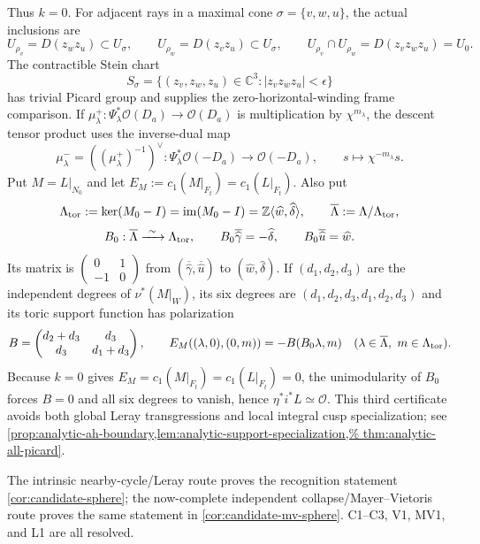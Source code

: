 \begin{auditrecord}
Thus $k=0$.  For adjacent rays in a maximal cone
$\sigma=\{v,w,u\}$, the actual inclusions are
\[
 U_{\rho_v}=D(z_wz_u)\subset U_\sigma,\qquad
 U_{\rho_w}=D(z_vz_u)\subset U_\sigma,\qquad
 U_{\rho_v}\cap U_{\rho_w}=D(z_vz_wz_u)=U_0.
\]
The contractible Stein chart
\[
 S_\sigma=\{(z_v,z_w,z_u)\in\mathbb C^3:
 |z_vz_wz_u|<\epsilon\}
\]
has trivial Picard group and supplies the zero-horizontal-winding frame
comparison.  If
$\mu_\lambda^+:\Psi_\lambda^*\mathcal O(D_a)\to\mathcal O(D_a)$
is multiplication by $\chi^{m_\lambda}$, the descent tensor product uses
the inverse-dual map
\[
 \mu_\lambda^-=((\mu_\lambda^+)^{-1})^\vee:
 \Psi_\lambda^*\mathcal O(-D_a)\longrightarrow\mathcal O(-D_a),
 \qquad s\longmapsto\chi^{-m_\lambda}s.
\]
Put $M=L|_{N_0}$ and let
$E_M:=c_1(M|_{F_t})=c_1(L|_{F_t})$.  Also put
\[
 \Lambda_{\rm tor}:=\ker(M_0-I)=\operatorname{im}(M_0-I)
 =\mathbb Z\langle\widehat w,\widehat\delta\rangle,
 \qquad \overline\Lambda:=\Lambda/\Lambda_{\rm tor},
\]
\[
 B_0:\overline\Lambda\xrightarrow{\ \sim\ }\Lambda_{\rm tor},
 \qquad
 B_0\overline{\widehat\gamma}=-\widehat\delta,\qquad
 B_0\overline{\widehat u}=\widehat w.
\]
Its matrix is
$\left(\begin{smallmatrix}0&1\\-1&0\end{smallmatrix}\right)$ from
$(\overline{\widehat\gamma},\overline{\widehat u})$ to
$(\widehat w,\widehat\delta)$.
If $(d_1,d_2,d_3)$ are the independent degrees of
$\nu^*(M|_W)$, its six degrees are
$(d_1,d_2,d_3,d_1,d_2,d_3)$ and its toric support function has
polarization
\[
 B=\begin{pmatrix}d_2+d_3&d_3\\d_3&d_1+d_3\end{pmatrix},
 \qquad E_M((\lambda,0),(0,m))=-B(B_0\lambda,m)
 \quad(\lambda\in\overline\Lambda,\ m\in\Lambda_{\rm tor}).
\]
Because $k=0$ gives
$E_M=c_1(M|_{F_t})=c_1(L|_{F_t})=0$, the unimodularity of $B_0$ forces
$B=0$ and all six degrees to vanish, hence
$\eta^*i^*L\simeq\mathcal O$.  This third certificate avoids both global
Leray transgressions and local integral cusp specialization; see
\cref{prop:analytic-ah-boundary,lem:analytic-support-specialization,%
thm:analytic-all-picard}.
\end{auditrecord}

The intrinsic nearby-cycle/Leray route proves the recognition statement
\cref{cor:candidate-sphere}; the now-complete independent
collapse/Mayer--Vietoris route proves the same statement in
\cref{cor:candidate-mv-sphere}.  C1--C3, V1, MV1, and L1 are all resolved.

